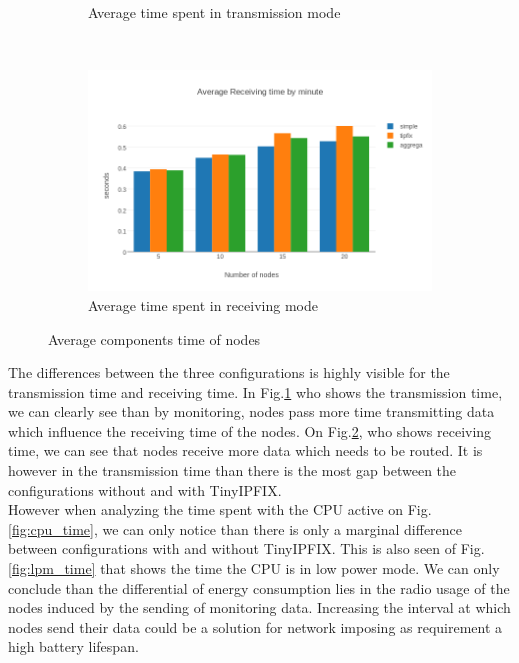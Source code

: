 \begin{figure}[h]
\begin{subfigure}[b]{0.45\textwidth}
        \caption{Average time spent in transmission mode}
        \label{fig:tx_time}
    \end{subfigure}
    ~
    \begin{subfigure}[b]{0.45\textwidth}
        \includegraphics[width=\textwidth]{res/average_rx}
        \caption{Average time spent in receiving mode}
        \label{fig:rx_time}
    \end{subfigure}
    \caption{Average components time of nodes}
    \label{fig:time_all}
\end{figure}

The differences between the three configurations is highly visible for the transmission time and receiving time. In Fig.\ref{fig:tx_time} who shows the transmission time, we can clearly see than by monitoring, nodes pass more time transmitting data which influence the receiving time of the nodes. On Fig.\ref{fig:rx_time}, who shows receiving time, we can see that nodes receive more data which needs to be routed. It is however in the transmission time than there is the most gap between the configurations without and with TinyIPFIX.\\

However when analyzing the time spent with the CPU active on Fig.\ref{fig:cpu_time}, we can only notice than there is only a marginal difference between configurations with and without TinyIPFIX. This is also seen of Fig.\ref{fig:lpm_time} that shows the time the CPU is in low power mode. We can only conclude than the differential of energy consumption lies in the radio usage of the nodes induced by the sending of monitoring data. Increasing the interval at which nodes send their data could be a solution for network imposing as requirement a high battery lifespan.\\

